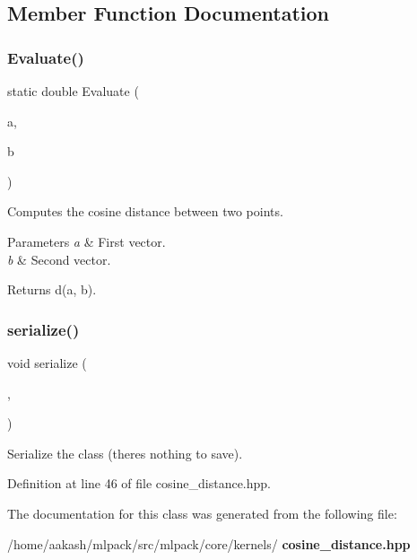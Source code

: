 \subsection{Member Function Documentation}
\mbox{\label{classmlpack_1_1kernel_1_1CosineDistance_a9cf31d3d6cf687f6f78a15ec94f46380}} 
\subsubsection{Evaluate()}
{\footnotesize\ttfamily static double Evaluate (\begin{DoxyParamCaption}\item[{const Vec\+TypeA \&}]{a,  }\item[{const Vec\+TypeB \&}]{b }\end{DoxyParamCaption})\hspace{0.3cm}{\ttfamily [static]}}



Computes the cosine distance between two points. 


\begin{DoxyParams}{Parameters}
{\em a} & First vector. \\
\hline
{\em b} & Second vector. \\
\hline
\end{DoxyParams}
\begin{DoxyReturn}{Returns}
d(a, b). 
\end{DoxyReturn}
\mbox{\label{classmlpack_1_1kernel_1_1CosineDistance_aa2ccb5a0533a6ba0abe6dfc1f98fbafb}} 
\subsubsection{serialize()}
{\footnotesize\ttfamily void serialize (\begin{DoxyParamCaption}\item[{Archive \&}]{,  }\item[{const uint32\+\_\+t}]{ }\end{DoxyParamCaption})\hspace{0.3cm}{\ttfamily [inline]}}



Serialize the class (there\textquotesingle{}s nothing to save). 



Definition at line 46 of file cosine\+\_\+distance.\+hpp.



The documentation for this class was generated from the following file\+:\begin{DoxyCompactItemize}
\item 
/home/aakash/mlpack/src/mlpack/core/kernels/\textbf{ cosine\+\_\+distance.\+hpp}\end{DoxyCompactItemize}
